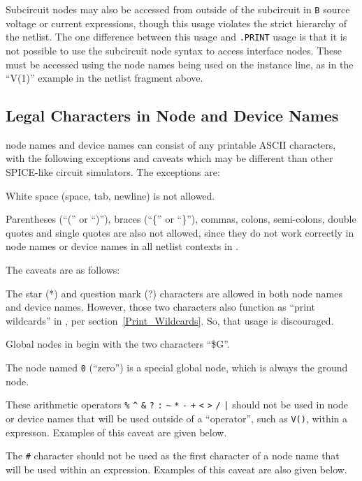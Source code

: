 Subcircuit nodes may also be accessed from outside of the subcircuit
in \texttt{B} source voltage or current expressions, though this usage
violates the strict hierarchy of the netlist.  The one difference
between this usage and \texttt{.PRINT} usage is that it is not
possible to use the subcircuit node syntax to access interface nodes.
These must be accessed using the node names being used on the instance
line, as in the ``V(1)'' example in the netlist fragment above.

\subsection{Legal Characters in Node and Device Names}
\label{legalCharacters}
 
\Xyce{} node names and device names can consist of any printable ASCII
characters, with the following exceptions and caveats which may be
different than other SPICE-like circuit simulators.  The exceptions are:
\begin{XyceItemize}
\item White space (space, tab, newline) is not allowed.
\item Parentheses (``('' or ``)''), braces (``\{'' or ``\}''), commas,
colons, semi-colons, double quotes and single quotes are also not
allowed, since they do not work correctly in node names or device names
in all netlist contexts in \Xyce{}.
\end{XyceItemize}
The caveats are as follows:
\begin{XyceItemize}
\item The star (*) and question mark (?) characters are allowed in both
node names and device names.  However, those two characters also function
as ``print wildcards'' in \Xyce{}, per section~\ref{Print_Wildcards}.
So, that usage is discouraged.
\item Global nodes in \Xyce{} begin with the two characters ``\$G''.
\item The node named \texttt{0} (``zero'') is a special global node,
which is always the ground node.
\item These arithmetic operators \verb|%| \verb|^| \verb|&| \verb|?| \verb|:|
\verb|~| \verb|*| \verb|-| \verb|+| \verb|<| \verb|>| \verb|/|
\verb+|+ should not be used in node or device names that will
be used outside of a \Xyce{} ``operator'', such as \texttt{V()}, within
a \Xyce{} expresson.  Examples of this caveat are given below.
\item The \verb|#| character should not be used as the first character
of a node name that will be used within an expression.  Examples of this
caveat are also given below.
\end{XyceItemize}
